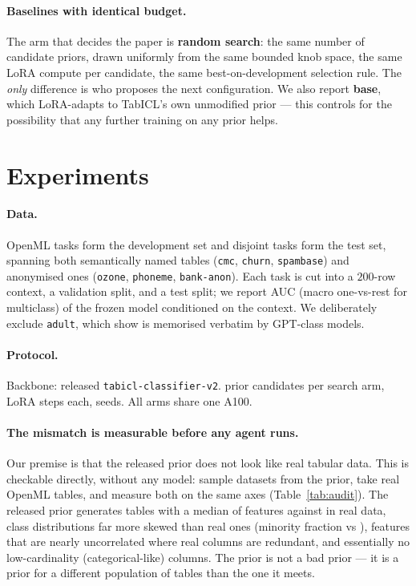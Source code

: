 \documentclass{article}
\begin{document}
\paragraph{Baselines with identical budget.} The arm that decides the paper is
\textbf{random search}: the same number of candidate priors, drawn uniformly from the same
bounded knob space, the same LoRA compute per candidate, the same
best-on-development selection rule. The \emph{only} difference is who proposes the next
configuration. We also report \textbf{base}, which LoRA-adapts to TabICL's own unmodified
prior --- this controls for the possibility that any further training on any prior helps.

\section{Experiments}
\label{sec:exp}

\paragraph{Data.} \NDev{} OpenML tasks form the development set and \NTest{} disjoint tasks
form the test set, spanning both semantically named tables (\texttt{cmc}, \texttt{churn},
\texttt{spambase}) and anonymised ones (\texttt{ozone}, \texttt{phoneme},
\texttt{bank-anon}). Each task is cut into a $200$-row context, a validation split, and a
test split; we report AUC (macro one-vs-rest for multiclass) of the frozen model conditioned
on the context. We deliberately exclude \texttt{adult}, which \citet{bordt2024elephants} show
is memorised verbatim by GPT-class models.

\paragraph{Protocol.} Backbone: released \texttt{tabicl-classifier-v2}. \NRounds{} prior
candidates per search arm, \Steps{} LoRA steps each, \NSeeds{} seeds. All arms share one
A100.

\paragraph{The mismatch is measurable before any agent runs.}
Our premise is that the released prior does not look like real tabular data. This is
checkable directly, without any model: sample datasets from the prior, take real OpenML
tables, and measure both on the same axes (Table~\ref{tab:audit}). The released prior
generates tables with a median of \PriorFeat{} features against \RealFeat{} in real data,
class distributions far more skewed than real ones (minority fraction \PriorMinority{} vs
\RealMinority{}), features that are nearly uncorrelated where real columns are redundant, and
essentially no low-cardinality (categorical-like) columns. The prior is not a bad prior --- it
is a prior for a different population of tables than the one it meets.
\end{document}
